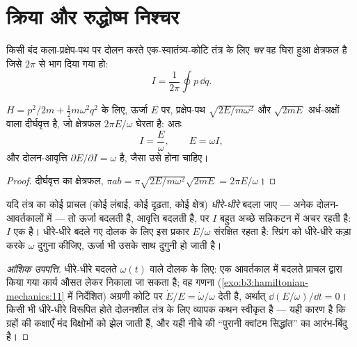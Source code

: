 \section{क्रिया और रुद्धोष्म निश्चर}

\begin{definition}[क्रिया चर]\label{def:b3:hamiltonian-mechanics:action-variable}
किसी बंद कला-प्रक्षेप-पथ पर दोलन करते एक-स्वातंत्र्य-कोटि तंत्र के लिए
\emph{ चर} वह घिरा हुआ क्षेत्रफल है जिसे
$2\pi$ से भाग दिया गया हो:
\[
I = \frac{1}{2\pi}\oint p\,\dd q .
\]
\end{definition}

\begin{proposition}[हरात्मक दोलक की क्रिया]\label{prop:b3:hamiltonian-mechanics:sho-action}
$H = p^2/2m + \tfrac12 m\omega^2q^2$ के लिए, ऊर्जा $E$ पर, प्रक्षेप-पथ
$\sqrt{2E/m\omega^2}$ और $\sqrt{2mE}$ अर्ध-अक्षों वाला दीर्घवृत्त है,
जो क्षेत्रफल $2\pi E/\omega$ घेरता है: अतः
\[
I = \frac{E}{\omega} , \qquad E = \omega I ,
\]
और दोलन-आवृत्ति $\partial E/\partial I = \omega$ है, जैसा उसे होना
चाहिए।
\end{proposition}

\begin{proof}
दीर्घवृत्त का क्षेत्रफल, $\pi ab = \pi\sqrt{2E/m\omega^2}\sqrt{2mE} =
2\pi E/\omega$।
\end{proof}

\begin{proposition}[रुद्धोष्म निश्चरता]\label{prop:b3:hamiltonian-mechanics:adiabatic}
यदि तंत्र का कोई प्राचल (कोई लंबाई, कोई दृढ़ता, कोई क्षेत्र)
\emph{धीरे-धीरे} बदला जाए --- अनेक दोलन-आवर्तकालों में --- तो ऊर्जा
बदलती है, आवृत्ति बदलती है, पर  $I$ बहुत अच्छे सन्निकटन में अचर
रहती है: $I$ एक \emph{} है।
धीरे-धीरे बदले गए दोलक के लिए इस प्रकार $E/\omega$ संरक्षित रहता है:
स्प्रिंग को धीरे-धीरे कड़ा करके $\omega$ दुगुना कीजिए, ऊर्जा भी उसके
साथ दुगुनी हो जाती है।
\end{proposition}

\begin{proof}[आंशिक उपपत्ति]
धीरे-धीरे बदलते $\omega(t)$ वाले दोलक के लिए: एक आवर्तकाल में
बदलते प्राचल द्वारा किया गया कार्य औसत लेकर निकाला जा सकता है;
वह गणना (\cref{exo:b3:hamiltonian-mechanics:11} में निर्देशित)
अग्रणी कोटि पर $\dot E/E = \dot\omega/\omega$ देती है, अर्थात्
$\dd(E/\omega)/\dd t = 0$। किसी भी धीरे-धीरे विरूपित होते दोलनशील
तंत्र के लिए व्यापक कथन स्वीकृत है --- यही कारण है कि ग्रहों की कक्षाएँ
मंद विक्षोभों को झेल जाती हैं, और यही नीचे की ``पुरानी क्वांटम
सिद्धांत'' का आरंभ-बिंदु है।
\end{proof}

